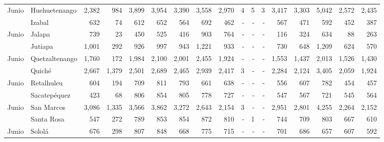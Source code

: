\begin{landscape}
\begin{center}
\begin{longtable}{llrrrrrrrrrrrrrrr}
			\multicolumn{1}{l}{	\footnotesize	 Junio 	}&	 Huehuetenango 	&	 2,382 	&	 984 	&	 3,899 	&	 3,954 	&	 3,390 	&	 3,558 	&	 2,970 	&	 4 	&	 5 	&	 3 	&	 3,417 	&	 3,303 	&	 5,042 	&	 2,572 	&	 2,435 	\\
			\rowcolor{color1!5!white}\multicolumn{1}{l}{	\footnotesize	 Junio 	}&	 Izabal 	&	 632 	&	 74 	&	 612 	&	 652 	&	 564 	&	 692 	&	 462 	&	 -   	&	 -   	&	 -   	&	 567 	&	 471 	&	 592 	&	 452 	&	 387 	\\
			\multicolumn{1}{l}{	\footnotesize	 Junio 	}&	 Jalapa 	&	 739 	&	 23 	&	 450 	&	 525 	&	 416 	&	 903 	&	 764 	&	 -   	&	 -   	&	 -   	&	 116 	&	 324 	&	 634 	&	 88 	&	 263 	\\
			\rowcolor{color1!5!white}\multicolumn{1}{l}{	\footnotesize	 Junio 	}&	 Jutiapa 	&	 1,001 	&	 292 	&	 926 	&	 997 	&	 943 	&	 1,221 	&	 933 	&	 -   	&	 -   	&	 -   	&	 730 	&	 648 	&	 1,209 	&	 624 	&	 570 	\\
			\multicolumn{1}{l}{	\footnotesize	 Junio 	}&	 Quetzaltenango 	&	 1,760 	&	 172 	&	 1,984 	&	 2,100 	&	 2,001 	&	 2,455 	&	 1,924 	&	 -   	&	 -   	&	 -   	&	 1,553 	&	 1,437 	&	 2,013 	&	 1,526 	&	 1,430 	\\
			\rowcolor{color1!5!white}\multicolumn{1}{l}{	\footnotesize	 Junio 	}&	 Quiché 	&	 2,667 	&	 1,379 	&	 2,501 	&	 2,689 	&	 2,465 	&	 2,939 	&	 2,417 	&	 3 	&	 -   	&	 -   	&	 2,284 	&	 2,124 	&	 3,405 	&	 2,059 	&	 1,924 	\\
			\multicolumn{1}{l}{	\footnotesize	 Junio 	}&	 Retalhuleu 	&	 604 	&	 194 	&	 709 	&	 811 	&	 793 	&	 661 	&	 638 	&	 -   	&	 -   	&	 -   	&	 556 	&	 607 	&	 782 	&	 454 	&	 457 	\\
			\rowcolor{color1!5!white}\multicolumn{1}{l}{	\footnotesize	 Junio 	}&	 Sacatepéquez 	&	 423 	&	 68 	&	 806 	&	 854 	&	 805 	&	 778 	&	 727 	&	 -   	&	 -   	&	 -   	&	 547 	&	 567 	&	 721 	&	 545 	&	 564 	\\
			\multicolumn{1}{l}{	\footnotesize	 Junio 	}&	 San Marcos 	&	 3,086 	&	 1,335 	&	 3,566 	&	 3,862 	&	 3,272 	&	 2,643 	&	 2,154 	&	 3 	&	 -   	&	 -   	&	 2,951 	&	 2,801 	&	 4,255 	&	 2,264 	&	 2,152 	\\
			\rowcolor{color1!5!white}\multicolumn{1}{l}{	\footnotesize	 Junio 	}&	 Santa Rosa 	&	 547 	&	 272 	&	 789 	&	 853 	&	 854 	&	 872 	&	 810 	&	 -   	&	 1 	&	 -   	&	 744 	&	 709 	&	 803 	&	 667 	&	 610 	\\
			\multicolumn{1}{l}{	\footnotesize	 Junio 	}&	 Sololá 	&	 676 	&	 298 	&	 807 	&	 848 	&	 668 	&	 775 	&	 715 	&	 -   	&	 -   	&	 -   	&	 701 	&	 686 	&	 657 	&	 607 	&	 592 	\\

\end{longtable}
\end{center}
\end{landscape}

